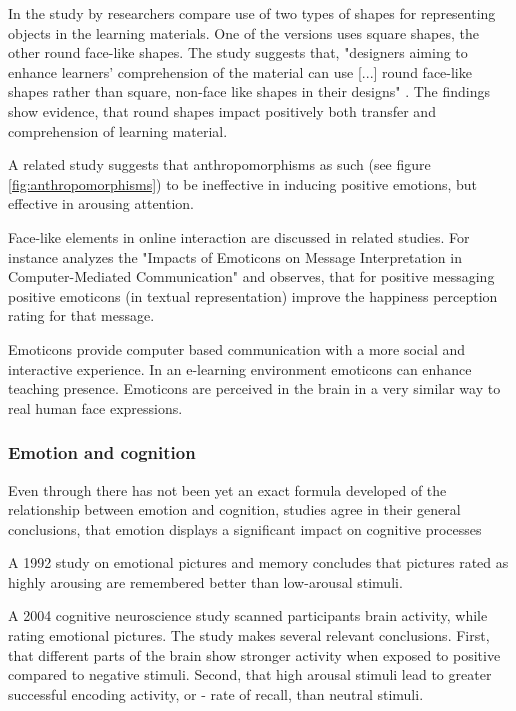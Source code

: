 		
		In the study by \cite{Plass2014} researchers compare use of two types of shapes for representing objects in the learning materials. One of the versions uses square shapes, the other round face-like shapes. The study suggests that, "designers aiming to enhance learners’ comprehension of the material can use [...] round face-like shapes rather than square, non-face like shapes in their designs" \cite{Plass2014}. The findings show evidence, that round shapes impact positively both transfer and comprehension of learning material.
		
		A related study \cite{Park2015} suggests that anthropomorphisms as such (see figure \ref{fig:anthropomorphisms}) to be ineffective in inducing positive emotions, but effective in arousing attention.
		
		Face-like elements in online interaction are discussed in related studies.
		For instance \cite{Walther2001} analyzes the "Impacts of Emoticons on Message Interpretation in Computer-Mediated Communication" and observes, that for positive messaging positive emoticons (in textual representation) improve the happiness perception rating for that message.  
		
		Emoticons provide computer based communication with a more social and interactive experience. In an e-learning environment emoticons can enhance teaching presence. \cite{Dunlap2016}
		Emoticons are perceived in the brain in a very similar way to real human face expressions. \cite{Churches2014}
		
		\subsubsection{Emotion and cognition} \label{sec:emotion-cognition}
		
		Even through there has not been yet an exact formula developed of the relationship between emotion and cognition, studies agree in their general conclusions, that emotion displays a significant impact on cognitive processes \cite{Sakaki2012, Leutner2014}
		
		A 1992 study \cite{Bradley1992} on emotional pictures and memory concludes that pictures rated as highly arousing are remembered better than low-arousal stimuli.
		
		A 2004 cognitive neuroscience study \cite{Dolcos2004} scanned participants brain activity, while rating emotional pictures. The study makes several relevant conclusions. First, that different parts of the brain show stronger activity when exposed to positive compared to negative stimuli. Second, that high arousal stimuli lead to greater successful encoding activity, or - rate of recall, than neutral stimuli. 
		
